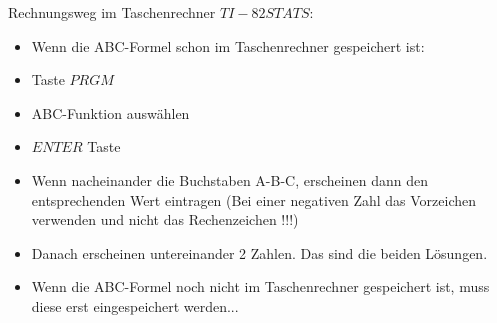 \newpage
\hfill \break
Rechnungsweg im Taschenrechner $TI-82STATS$:\\
\begin{itemize}
    \item Wenn die ABC-Formel schon im Taschenrechner gespeichert ist:
    \item Taste $PRGM$
    \item ABC-Funktion auswählen
    \item $ENTER$ Taste
    \item Wenn nacheinander die Buchstaben A-B-C, erscheinen dann den entsprechenden Wert eintragen (Bei einer negativen Zahl das Vorzeichen verwenden und nicht das Rechenzeichen !!!)
    \item Danach erscheinen untereinander 2 Zahlen. Das sind die beiden Lösungen.
    \item Wenn die ABC-Formel noch nicht im Taschenrechner gespeichert ist, muss diese erst eingespeichert werden...
\end{itemize}
